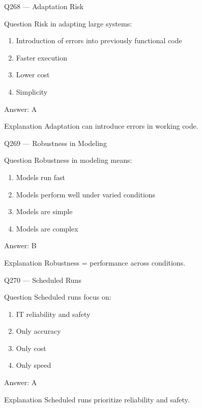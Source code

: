\documentclass[aspectratio=169,8pt]{beamer}
\begin{document}
\begin{frame}{Q268 --- Adaptation Risk}
\begin{block}{Question}
Risk in adapting large systems:
\begin{enumerate}
\item Introduction of errors into previously functional code
\item Faster execution
\item Lower cost
\item Simplicity
\end{enumerate}
\end{block}
\begin{exampleblock}{Answer: A}\end{exampleblock}
\begin{block}{Explanation}
Adaptation can introduce errors in working code.
\end{block}
\end{frame}

\begin{frame}{Q269 --- Robustness in Modeling}
\begin{block}{Question}
Robustness in modeling means:
\begin{enumerate}
\item Models run fast
\item Models perform well under varied conditions
\item Models are simple
\item Models are complex
\end{enumerate}
\end{block}
\begin{exampleblock}{Answer: B}\end{exampleblock}
\begin{block}{Explanation}
Robustness = performance across conditions.
\end{block}
\end{frame}

\begin{frame}{Q270 --- Scheduled Runs}
\begin{block}{Question}
Scheduled runs focus on:
\begin{enumerate}
\item IT reliability and safety
\item Only accuracy
\item Only cost
\item Only speed
\end{enumerate}
\end{block}
\begin{exampleblock}{Answer: A}\end{exampleblock}
\begin{block}{Explanation}
Scheduled runs prioritize reliability and safety.
\end{block}
\end{frame}
\end{document}
